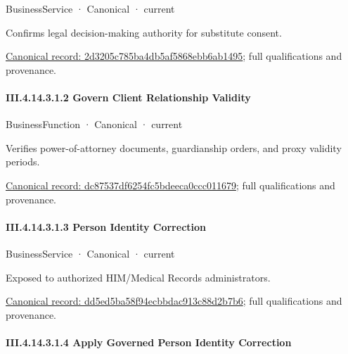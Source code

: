 \label{element:2d3205c785ba4db5af5868ebb6ab1495}
{\small BusinessService · Canonical · current}\par

Confirms legal decision-making authority for substitute consent.


{\footnotesize \href{../../../../../../../../continuum/business/business-service/2d3205c785ba4db5af5868ebb6ab1495.md}{Canonical record: 2d3205c785ba4db5af5868ebb6ab1495}; full qualifications and provenance.}\par
\paragraph*{III.4.14.3.1.2 Govern Client Relationship Validity}
\label{navigation:III.4.14.3.1.2}

\label{element:dc87537df6254fc5bdeeca0ccc011679}
{\small BusinessFunction · Canonical · current}\par

Verifies power-of-attorney documents, guardianship orders, and proxy validity periods.


{\footnotesize \href{../../../../../../../../continuum/business/business-function/dc87537df6254fc5bdeeca0ccc011679.md}{Canonical record: dc87537df6254fc5bdeeca0ccc011679}; full qualifications and provenance.}\par
\paragraph*{III.4.14.3.1.3 Person Identity Correction}
\label{navigation:III.4.14.3.1.3}

\label{element:dd5ed5ba58f94ecbbdac913c88d2b7b6}
{\small BusinessService · Canonical · current}\par

Exposed to authorized HIM/Medical Records administrators.


{\footnotesize \href{../../../../../../../../continuum/business/business-service/dd5ed5ba58f94ecbbdac913c88d2b7b6.md}{Canonical record: dd5ed5ba58f94ecbbdac913c88d2b7b6}; full qualifications and provenance.}\par
\paragraph*{III.4.14.3.1.4 Apply Governed Person Identity Correction}
\label{navigation:III.4.14.3.1.4}

